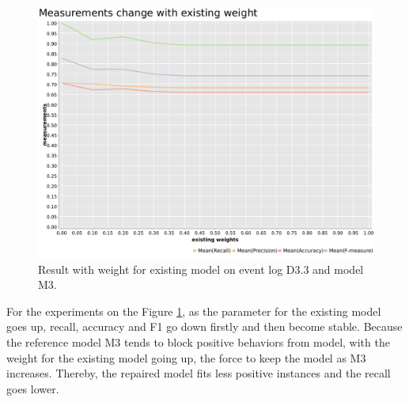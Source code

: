 \begin{figure}[htb]
	\includegraphics[width=\linewidth]{figures/evaluation/M3-D43-ext-weight-plot.pdf}
	\caption[Result tendency with weight for the existing model]{Result with weight for existing model on event log D3.3 and model M3.}
	\label{fig:ext-weight}
\end{figure} 
For the experiments on the Figure \ref{fig:ext-weight}, as the parameter for the existing model goes up, recall, accuracy and F1 go down firstly and then become stable. Because the reference model M3 tends to block positive behaviors  from model, with the weight for the existing model going up, the force to keep the model as M3 increases. Thereby, the repaired model fits less positive instances and the recall goes lower. 

